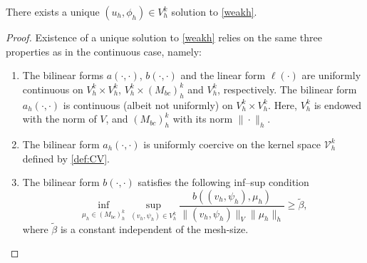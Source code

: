 \documentclass[a4paper,final]{siamltex}
\newcommand{\CV}{\mathcal{V}}
\newcommand{\Mb}{{(M_{bc})}}
\begin{document}
\begin{theorem}
There exists a unique $(u_h,\phi_h) \in V^k_h$ solution to \eqref{weakh}.
\label{TMexistdiscrete}
\end{theorem}

\begin{proof}%
Existence of a unique solution to \eqref{weakh} relies on the same three
properties as in the continuous case, namely:

\begin{enumerate}
\item The bilinear forms $a(\cdot,\cdot)$, $b(\cdot,\cdot)$ and the linear form 
$\ell(\cdot)$ are uniformly continuous on $V^k_h \times V^k_h$, $V^k_h \times \Mb^k_h$ and 
$V^k_h$, respectively. The bilinear form $a_h(\cdot,\cdot)$ is continuous (albeit
not uniformly) on $V^k_h \times V^k_h$. Here, $V_h^k$ is endowed with the norm of $V$, and
$\Mb^k_h$ with its norm $\|\cdot\|_h$.
\item The bilinear form $a_h(\cdot,\cdot)$ is uniformly coercive on the kernel space $\CV^k_h$ defined
by \eqref{def:CV}.  
\item The bilinear form $b(\cdot,\cdot)$ satisfies the following inf--sup condition 
\[ \inf_{\mu_h \in \Mb^k_h} \sup_{(v_h, \psi_h)  \in V^k_h} \frac{b((v_h,\psi_h),\mu_h)} 
{ \|(v_h,\psi_h)\|_{V} \|\mu_h\|_{h}} \geq \tilde \beta, \]
where $\tilde \beta $ is a constant independent of the mesh-size.


\end{enumerate}
\end{proof}
\end{document}

